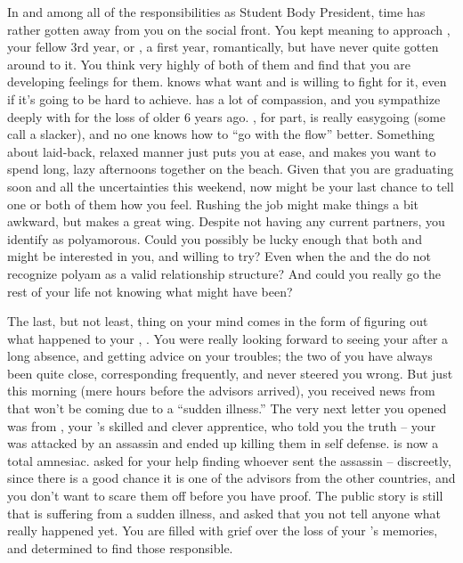 \documentclass[char]{GL2020}
\begin{document}
In and among all of the responsibilities as Student Body President, time has rather gotten away from you on the social front. You kept meaning to approach \cHeir{}, your fellow 3rd year, or \cChupStudent{\full}, a first year, romantically, but have never quite gotten around to it. You think very highly of both of them and find that you are developing feelings for them. \cHeir{} knows what \cHeir{\they} want\cHeir{\plural} and is willing to fight for it, even if it's going to be hard to achieve. \cHeir{} has a lot of compassion, and you sympathize deeply with \cHeir{\them} for the loss of \cHeir{\their} older \cHeirSibling{\sibling} 6 years ago. \cChupStudent{}, for \cChupStudent{\their} part, is really easygoing (some call \cChupStudent{\them} a slacker), and no one knows how to ``go with the flow'' better. Something about \cChupStudent{\their} laid-back, relaxed manner just puts you at ease, and makes you want to spend long, lazy afternoons together on the beach. Given that you are graduating soon and all the uncertainties this weekend, now might be your last chance to tell one or both of them how you feel. Rushing the job might make things a bit awkward, but \cInitiate{} makes a great wing\cInitiate{\person}. Despite not having any current partners, you identify as polyamorous. Could you possibly be lucky enough that both \cHeir{} and \cChupStudent{} might be interested in you, and willing to try? Even when the \pFarm{} and the \pTech{} do not recognize polyam as a valid relationship structure? And could you really go the rest of your life not knowing what might have been?

The last, but not least, thing on your mind comes in the form of figuring out what happened to your \cHeadDiplomat{\auncle}, \cHeadDiplomat{}. You were really looking forward to seeing your \cHeadDiplomat{\auncle} after a long absence, and getting \cHeadDiplomat{\their} advice on your troubles; the two of you have always been quite close, corresponding frequently, and \cHeadDiplomat{\they} never steered you wrong. But just this morning (mere hours before the advisors arrived), you received news from \cEbbPriest{\full} that \cHeadDiplomat{} won't be coming due to a ``sudden illness.'' The very next letter you opened was from \cJuniorStatesman{\full}, your \cHeadDiplomat{\auncle}'s skilled and clever apprentice, who told you the truth – your \cHeadDiplomat{\auncle} was attacked by an assassin and ended up killing them in self defense. \cHeadDiplomat{} is now a total amnesiac. \cJuniorStatesman{} asked for your help finding whoever sent the assassin -- discreetly, since there is a good chance it is one of the advisors from the other countries, and you don't want to scare them off before you have proof. The public story is still that \cHeadDiplomat{} is suffering from a sudden illness, and \cJuniorStatesman{} asked that you not tell anyone what really happened yet. You are filled with grief over the loss of your \cHeadDiplomat{\auncle}'s memories, and determined to find those responsible.
\end{document}
